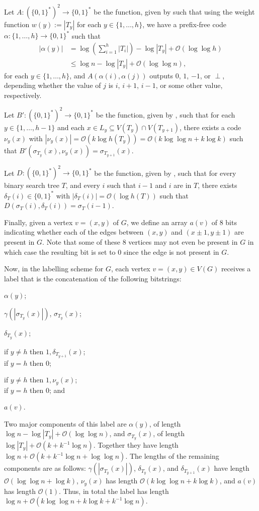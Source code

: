\documentclass[10pt, conference, compsocconf]{IEEEtran}
\newcommand{\Oh}{\mathcal{O}}
\let\leq\leqslant
\begin{document}
Let $A:(\{0,1\}^{*})^2\to\{0,1\}^*$ be the function, given by  such that
using the weight function $w(y):=|T_y|$ for each $y\in\{1,\dots,h\}$,
we have a prefix-free code $\alpha:\{1,\dots,h\}\to\{0,1\}^*$ such that
\begin{align*}
|\alpha(y)|&=\log\left(\textstyle\sum_{i=1}^h|T_i|\right) - \log|T_y| + \Oh(\log\log h)\\
&\leq \log n - \log|T_y| + \Oh(\log\log n),
\end{align*}
for each $y\in\{1,\dots,h\}$, and $A(\alpha(i),\alpha(j))$ outputs $0$, $1$, $-1$, or $\perp$, depending whether the value of $j$ is $i$, $i+1$, $i-1$, or some other value, respectively.


Let $B':(\{0,1\}^{*})^2\to\{0,1\}^*$ be the function, given by , such that
for each $y\in\{1,\dots,h-1\}$ and each $x\in L_{y}\subseteq V(T_y)\cap V(T_{y+1})$,
there exists a code $\nu_{y}(x)$ with $|\nu_{y}(x)|=\Oh(k\log h(T_{y}))=\Oh(k\log\log n+k \log k)$ such that $B'(\sigma_{T_{y}}(x),\nu_{y}(x))=\sigma_{T_{y+1}}(x)$.

Let $D:(\{0,1\}^{*})^2\to\{0,1\}^*$ be the function, given by , such that for every binary search tree $T$, and every $i$ such that $i-1$ and $i$ are in $T$, there exists $\delta_T(i) \in \{0,1\}^*$ with $|\delta_T(i)|=\Oh(\log h(T))$ such that
$D(\sigma_T(i),\delta_T(i))=\sigma_T(i-1)$.

Finally, given a vertex $v=(x,y)$ of $G$, we define
an array $a(v)$ of $8$ bits indicating whether each of the edges between $(x,y)$ and $(x\pm 1,y\pm 1)$ are present in $G$. Note that some of these $8$ vertices may not even be present in $G$ in which case the resulting bit is set to $0$ since the edge is not present in $G$.

Now, in the labelling scheme for $G$, each vertex $v=(x,y)\in V(G)$ receives a label that is the concatenation of the following bitstrings:
\begin{compactenum}[(P1)]
\item $\alpha(y)$;
\item $\gamma(|\sigma_{T_y}(x)|)$, $\sigma_{T_y}(x)$;
\item $\delta_{T_y}(x)$;
\item
if $y\neq h$ then $1,\delta_{T_{y+1}}(x)$;\\
if $y=h$ then $0$;
\item
if $y\neq h$ then $1,\nu_y(x)$;\\
if $y=h$ then $0$; and
\item $a(v)$.
\end{compactenum}
Two major components of this label are $\alpha(y)$, of length $\log n - \log|T_y| + \Oh(\log\log n)$,
and $\sigma_{T_y}(x)$, of length $\log|T_y| + \Oh(k+k^{-1}\log n)$.
Together they have length $\log n + \Oh(k+k^{-1}\log n+\log\log n)$.
The lengths of the remaining components are as follows:
$\gamma(|\sigma_{T_y}(x)|)$,
$\delta_{T_y}(x)$, and $\delta_{T_{y+1}}(x)$
 have length $\Oh(\log\log n + \log k)$, $\nu_y(x)$ has length $\Oh(k\log\log n + k\log k)$, and $a(v)$ has length $\Oh(1)$.
Thus, in total the label has length  $\log n+ \Oh(k\log\log n + k\log k + k^{-1}\log n)$.
\end{document}
